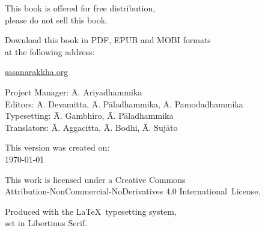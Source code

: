 \cleartoverso
\thispagestyle{empty}

\vspace*{-\baselineskip}

{%

\fontsize{9}{11}\selectfont
\centering
\setlength{\parindent}{0pt}%
\setlength{\parskip}{0.8\baselineskip}%


This book is offered for free distribution,\\
please do not sell this book.

Download this book in PDF, EPUB and MOBI formats\\
at the following address:

\href{https://sasanarakkha.org/}{sasanarakkha.org}

\vfill

Project Manager: Ā. Ariyadhammika\\
Editors: Ā. Devamitta, Ā. Pāladhammika, Ā. Pamodadhammika\\
Typesetting: Ā. Gambhiro, Ā. Pāladhammika\\
Translators: Ā. Aggacitta, Ā. Bodhi, Ā. Sujāto

\vfill

This version was created on:\\
\today

\vfill

This work is licensed under a Creative Commons\\
Attribution-NonCommercial-NoDerivatives 4.0 International~License.

Produced with the \LaTeX\ typesetting system,\\
set in Libertinus Serif.

\theEditionInfo

}
